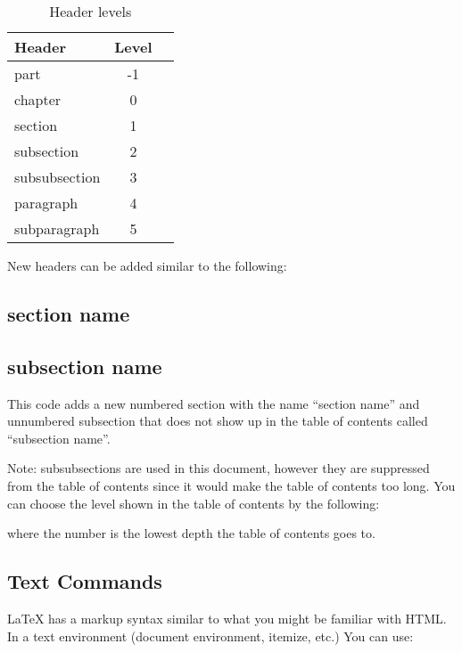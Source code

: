 \begin{table}[H]
\centering
\caption{Header levels}
\label{Tab:HeaderLevels}
\begin{tabular}{|l|*{2}{c|}}
\hline
Header        & Level \\\hline
part          & -1    \\
chapter       & 0     \\ 
section       & 1     \\ 
subsection    & 2     \\ 
subsubsection & 3     \\ 
paragraph     & 4     \\ 
subparagraph  & 5 \\\hline
\end{tabular}
\end{table}

New headers can be added similar to the following:

\begin{center}
\begin{latexcode}
\section{section name}
\subsection*{subsection name}
\end{latexcode}
\end{center}

This code adds a new numbered section with the name ``section name'' and unnumbered subsection that does not show up in the table of contents called ``subsection name''.



Note: subsubsections are used in this document, however they are suppressed from the table of contents since it would make the table of contents too long. You can choose the level shown in the table of contents by the following:

\begin{center}
\begin{latexcode}
\setcounter{tocdepth}{2}
\end{latexcode}
\end{center}

where the number is the lowest depth the table of contents goes to.

\subsection{Text Commands}
\LaTeX{} has a markup syntax similar to what you might be familiar with HTML. In a text environment (document environment, itemize, etc.) You can use: 

